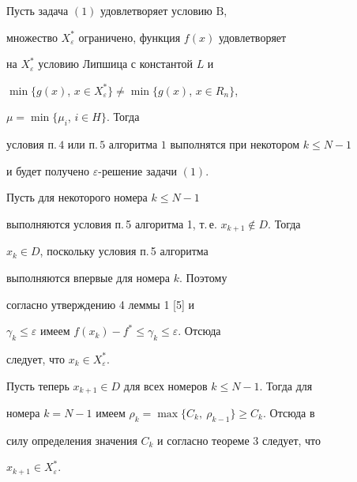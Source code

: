 \begin{thm}


Пусть задача $(1)$ удовлетворяет условию $\mathrm B$, 


множество $X_{\varepsilon}^*$ ограничено, функция $f(x)$ удовлетворяет


на $X_{\varepsilon}^*$ условию Липшица с константой $L$ и 


$\min\{g(x)$, $x\in X_{\varepsilon}^*\}\ne\min\{g(x)$, $x\in R_n\}$,


$\mu=\min\{\mu_i$, $i\in H\}$. Тогда


условия п.\,$4$ или п.\,$5$ алгоритма $1$ выполнятся при некотором $k\le N-1$


и будет получено $\varepsilon$-решение задачи $(1)$.


\end{thm}





\begin{pf}


Пусть для некоторого номера $k\le N-1$


выполняются условия п.\,5 алгоритма 1, т.\,е. $x_{k+1}\notin D$. Тогда


$x_k\in D$, поскольку условия п.\,5 алгоритма


выполняются впервые для номера $k$. Поэтому


согласно утверждению 4 леммы 1 [5] и


$\gamma_k\le\varepsilon$ имеем $f(x_k)-f^*\le\gamma_k\le\varepsilon$. Отсюда


следует, что $x_k\in X_{\varepsilon}^*$.





Пусть теперь $x_{k+1}\in D$ для всех номеров $k\le N-1$. Тогда для


номера $k=N-1$ имеем $\rho_k=\max\{C_k,\ \rho_{k-1}\}\ge C_k$. Отсюда в


силу определения значения $C_k$ и согласно теореме 3 следует, что


$x_{k+1}\in X_{\varepsilon}^*$.


\end{pf}





